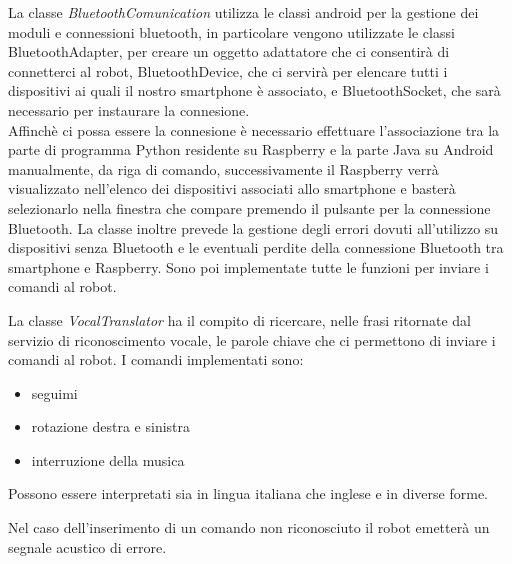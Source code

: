 \documentclass[12pt]{article}
\begin{document}
\medskip

La classe \emph{BluetoothComunication} utilizza le classi android per la gestione dei moduli e connessioni bluetooth, in particolare
vengono utilizzate le classi BluetoothAdapter, per creare un oggetto adattatore che ci consentirà di connetterci al robot, BluetoothDevice, che ci servirà per elencare tutti i dispositivi ai quali il nostro smartphone è associato, e BluetoothSocket, che sarà necessario per instaurare la connesione.\\
Affinchè ci possa essere la connesione è necessario effettuare l'associazione tra la parte di programma Python residente su Raspberry e la parte Java su Android manualmente, da riga di comando, successivamente il Raspberry verrà visualizzato nell'elenco dei dispositivi associati allo smartphone e basterà selezionarlo nella finestra che compare premendo il pulsante per la connessione Bluetooth.
La classe inoltre prevede la gestione degli errori dovuti all'utilizzo su dispositivi senza Bluetooth e le eventuali perdite della connessione Bluetooth tra smartphone e Raspberry. Sono poi implementate tutte le funzioni per inviare i comandi al robot.

\medskip

La classe \emph{VocalTranslator} ha il compito di ricercare, nelle frasi ritornate dal servizio di riconoscimento vocale, le parole chiave che ci permettono di inviare i comandi al robot.
I comandi implementati sono:
\begin{itemize}
\item seguimi
\item rotazione destra e sinistra
\item interruzione della musica
\end{itemize}

Possono essere interpretati sia in lingua italiana che inglese e in diverse forme.

Nel caso dell'inserimento di un comando non riconosciuto il robot emetterà un segnale acustico di errore.
\end{document}
